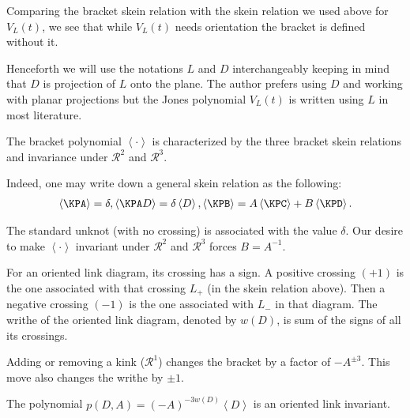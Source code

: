 \begin{remark}
\label{cha:jones-polynomial-2}
  Comparing the bracket skein relation with the skein relation we used above for $V_L(t)$, we see that while $V_L(t)$ needs orientation the bracket is defined without it.
\end{remark}

\begin{remark}
  Henceforth we will use the notations $L$ and $D$ interchangeably keeping in mind that $D$ is projection of $L$ onto the plane. The author prefers using $D$ and working with planar projections but the Jones polynomial $V_L(t)$ is written using $L$ in most literature.
\end{remark}

\begin{proposition}
\label{cha:jones-polynomial-3}
  The bracket polynomial $\left< \cdot \right>$ is characterized by the three bracket skein relations and invariance under $\mathcal{R}^2$ and $\mathcal{R}^3$.
\end{proposition}

Indeed, one may write down a general skein relation as the following:
\begin{align*}
  \left< \KPA \right> = \delta, \left< \KPA D \right> = \delta \left< D \right>, \left< \KPB \right> = A\left< \KPC \right> + B\left< \KPD \right>.
\end{align*}

The standard unknot (with no crossing) is associated with the value $\delta$. Our desire to make $\left< \cdot \right>$ invariant under $\mathcal{R}^2$ and $\mathcal{R}^3$ forces $B = A^{-1}$.

For an oriented link diagram, its crossing has a sign. A positive crossing $(+1)$ is the one associated with that crossing $L_+$ (in the skein relation above). Then a negative crossing $(-1)$ is the one associated with $L_-$ in that diagram. The writhe of the oriented link diagram, denoted by $w(D)$, is sum of the signs of all its crossings.

\begin{remark}
\label{cha:jones-polynomial-4}
  Adding or removing a kink ($\mathcal{R}^1$) changes the bracket by a factor of $-A^{\pm 3}$. This move also changes the writhe by $\pm 1$.
\end{remark}

\begin{theorem}
\label{cha:jones-polynomial-5}
The polynomial $p(D,A) = (-A)^{-3w(D)}\left< D \right>$ is an oriented link invariant.
\end{theorem}


